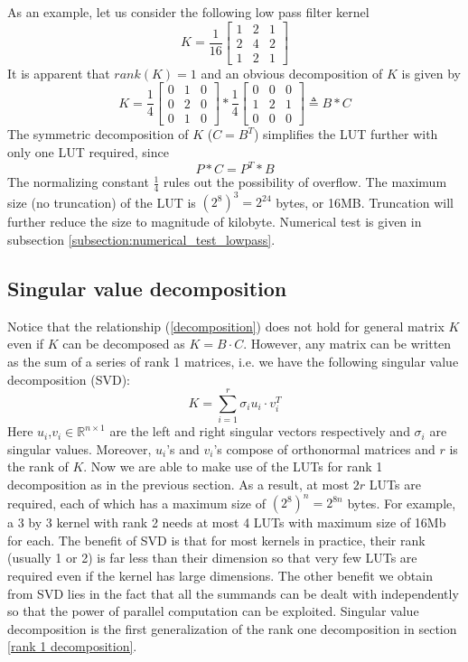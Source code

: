 \documentclass[12pt]{amsart}
\theoremstyle{definition}
\theoremstyle{remark}
\numberwithin{thm}{section}
\begin{document}
As an example, let us consider the following low pass filter kernel
$$
K=\frac{1}{16}
\begin{bmatrix}
1 & 2 & 1\\
2 & 4 & 2\\
1 & 2 & 1
\end{bmatrix}
$$
It is apparent that $rank(K)=1$ and an obvious decomposition of $K$ is given by 
$$
K=\frac{1}{4}
\begin{bmatrix}
0 & 1 & 0\\
0 & 2 & 0\\
0 & 1 & 0
\end{bmatrix}*\frac{1}{4}
\begin{bmatrix}
0 & 0 & 0\\
1 & 2 & 1\\
0 & 0 & 0
\end{bmatrix}\triangleq B*C
$$
The symmetric decomposition of $K$ ($C=B^T$) simplifies the LUT further with only one LUT required, since
\[P*C=P^T*B\]
The normalizing constant $\frac{1}{4}$ rules out the possibility of overflow. The maximum size (no truncation) of the LUT is $(2^8)^3=2^{24}$ bytes, or 16MB. Truncation will further reduce the size to magnitude of kilobyte. Numerical test is given in subsection \ref{subsection:numerical_test_lowpass}. 
\subsection{Singular value decomposition}
Notice that the relationship (\ref{decomposition}) does not hold for general matrix $K$ even if $K$ can be decomposed as $K=B\cdot C$. However, any matrix can be written as the sum of a series of rank 1 matrices, i.e. we have the following singular value decomposition (SVD): 
\[K=\sum_{i=1}^{r}\sigma_i u_i\cdot v_i^T\]
Here $u_i$,$v_i\in\mathbb{R}^{n\times 1}$ are the left and right singular vectors respectively and $\sigma_i$ are singular values. Moreover, $u_i$'s and $v_i$'s compose of orthonormal matrices and $r$ is the rank of $K$. Now we are able to make use of the LUTs for rank 1 decomposition as in the previous section. As a result, at most $2r$ LUTs are required, each of which has a maximum size of $(2^8)^n=2^{8n}$ bytes. For example, a 3 by 3 kernel with rank 2 needs at most 4 LUTs with maximum size of 16Mb for each. The benefit of SVD is that for most kernels in practice, their rank (usually 1 or 2) is far less than their dimension so that very few LUTs are required even if the kernel has large dimensions. The other benefit we obtain from SVD lies in the fact that all the summands can be dealt with independently so that the power of parallel computation can be exploited. Singular value decomposition is the first generalization of the rank one decomposition in section \ref{rank 1 decomposition}. 
\end{document}
